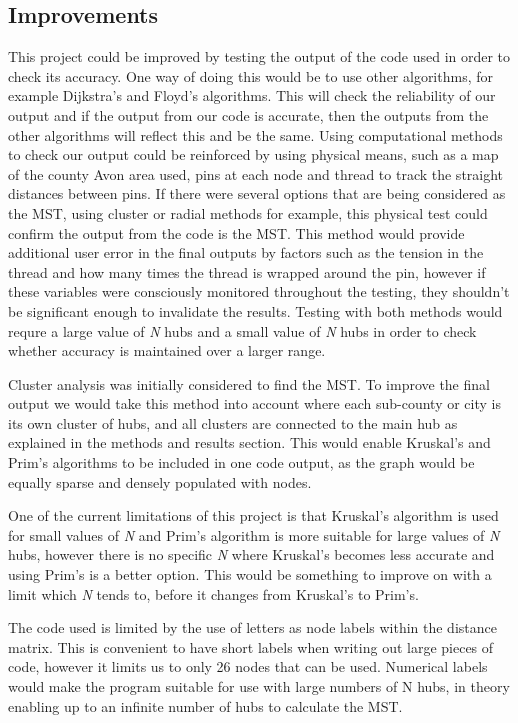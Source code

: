 \documentclass[twocolumn]{article}
\begin{document}
\subsection{Improvements}
This project could be improved by testing the output of the code used in order to check its accuracy. One way of doing this would be to use other algorithms, for example Dijkstra’s and Floyd’s algorithms. This will check the reliability of our output and if the output from our code is accurate, then the outputs from the other algorithms will reflect this and be the same. Using computational methods to check our output could be reinforced by using physical means, such as a map of the county Avon area used, pins at each node and thread to track the straight distances between pins. If there were several options that are being considered as the MST, using cluster or radial methods for example, this physical test could confirm the output from the code is the MST. This method would provide additional user error in the final outputs by factors such as the tension in the thread and how many times the thread is wrapped around the pin, however if these variables were consciously monitored throughout the testing, they shouldn’t be significant enough to invalidate the results.
Testing with both methods would requre a large value of \textit{N} hubs and a small value of \textit{N} hubs in order to check whether accuracy is maintained over a larger range.

Cluster analysis was initially considered to find the MST. To improve the final output we would take this method into account where each sub-county or city is its own cluster of hubs, and all clusters are connected to the main hub as explained in the methods and results section. This would enable Kruskal’s and Prim’s algorithms to be included in one code output, as the graph would be equally sparse and densely populated with nodes.

One of the current limitations of this project is that Kruskal’s algorithm is used for small values of \textit{N} and Prim’s algorithm is more suitable for large values of \textit{N} hubs, however there is no specific \textit{N} where Kruskal’s becomes less accurate and using Prim’s is a better option. This would be something to improve on with a limit which \textit{N} tends to, before it changes from Kruskal’s to Prim’s.

The code used is limited by the use of letters as node labels within the distance matrix. This is convenient to have short labels when writing out large pieces of code, however it limits us to only 26 nodes that can be used. Numerical labels would make the program suitable for use with large numbers of N hubs, in theory enabling up to an infinite number of hubs to calculate the MST.  
\end{document}

